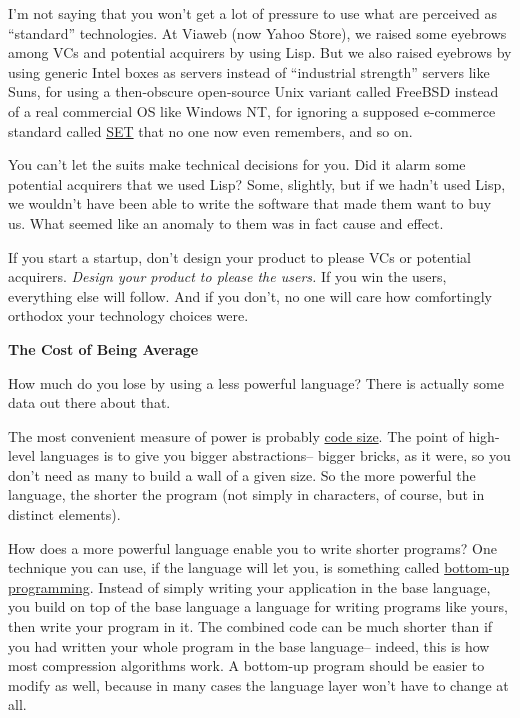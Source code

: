 I'm not saying that you won't get a lot of pressure to use what are
perceived as ``standard'' technologies. At Viaweb (now Yahoo Store), we
raised some eyebrows among VCs and potential acquirers by using Lisp.
But we also raised eyebrows by using generic Intel boxes as servers
instead of ``industrial strength'' servers like Suns, for using a
then-obscure open-source Unix variant called FreeBSD instead of a real
commercial OS like Windows NT, for ignoring a supposed e-commerce
standard called \href{http://news.com.com/2100-1017-225723.html}{SET}
that no one now even remembers, and so on.

You can't let the suits make technical decisions for you. Did it alarm
some potential acquirers that we used Lisp? Some, slightly, but if we
hadn't used Lisp, we wouldn't have been able to write the software that
made them want to buy us. What seemed like an anomaly to them was in
fact cause and effect.

If you start a startup, don't design your product to please VCs or
potential acquirers. \emph{Design your product to please the users.} If
you win the users, everything else will follow. And if you don't, no one
will care how comfortingly orthodox your technology choices were.

\textbf{The Cost of Being Average}

How much do you lose by using a less powerful language? There is
actually some data out there about that.

The most convenient measure of power is probably \href{power.html}{code
size}. The point of high-level languages is to give you bigger
abstractions-- bigger bricks, as it were, so you don't need as many to
build a wall of a given size. So the more powerful the language, the
shorter the program (not simply in characters, of course, but in
distinct elements).

How does a more powerful language enable you to write shorter programs?
One technique you can use, if the language will let you, is something
called \href{progbot.html}{bottom-up programming}. Instead of simply
writing your application in the base language, you build on top of the
base language a language for writing programs like yours, then write
your program in it. The combined code can be much shorter than if you
had written your whole program in the base language-- indeed, this is
how most compression algorithms work. A bottom-up program should be
easier to modify as well, because in many cases the language layer won't
have to change at all.

